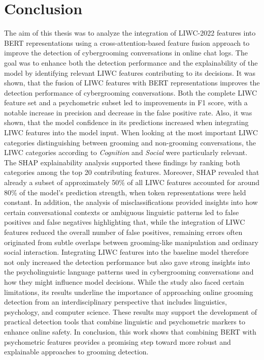\chapter{Conclusion}
The aim of this thesis was to analyze the integration of LIWC-2022 features into BERT representations using a cross-attention-based feature fusion approach to improve the detection of cybergrooming conversations in online chat logs. The goal was to enhance both the detection performance and the explainability of the model by identifying relevant LIWC features contributing to its decisions. It was shown, that the fusion of LIWC features with BERT representations improves the detection performance of cybergrooming conversations. Both the complete LIWC feature set and a psychometric subset led to improvements in F1 score, with a notable increase in precision and decrease in the false positive rate. Also, it was shown, that the model confidence in its predictions increased when integrating LIWC features into the model input. When looking at the most important LIWC categories distinguishing between grooming and non-grooming conversations, the LIWC categories according to \textit{Cognition} and \textit{Social} were particularly relevant. The SHAP explainability analysis supported these findings by ranking both categories among the top 20 contributing features. Moreover, SHAP revealed that already a subset of approximately 50\% of all LIWC features accounted for around 80\% of the model’s prediction strength, when token representations were held constant. In addition, the analysis of misclassifications provided insights into how certain conversational contexts or ambiguous linguistic patterns led to false positives and false negatives highlighting that, while the integration of LIWC features reduced the overall number of false positives, remaining errors often originated from subtle overlaps between grooming-like manipulation and ordinary social interaction. Integrating LIWC features into the baseline model therefore not only increased the detection performance but also gave strong insights into the psycholinguistic language patterns used in cybergrooming conversations and how they might influence model decisions. While the study also faced certain limitations, its results underline the importance of approaching online grooming detection from an interdisciplinary perspective that includes linguistics, psychology, and computer science. These results may support the development of practical detection tools that combine linguistic and psychometric markers to enhance online safety. In conclusion, this work shows that combining BERT with psychometric features provides a promising step toward more robust and explainable approaches to grooming detection.